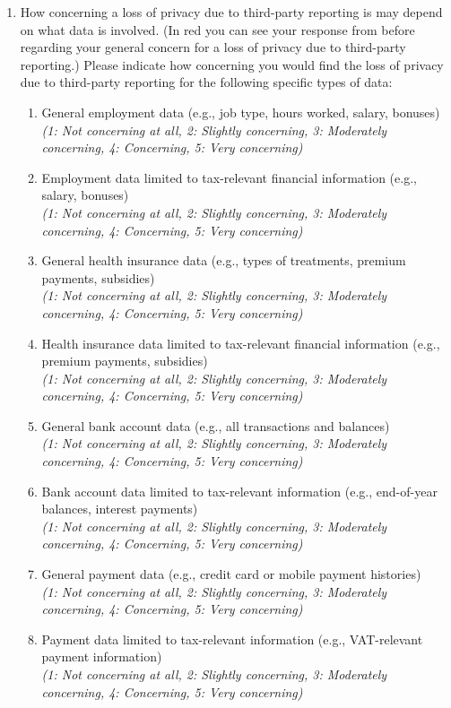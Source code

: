 \documentclass[11pt]{article}
\begin{document}
\begin{enumerate}[resume]
    \item How concerning a loss of privacy due to third-party reporting is may depend on what data is involved. (In red you can see your response from before regarding your general concern for a loss of privacy due to third-party reporting.) Please indicate how concerning you would find the loss of privacy due to third-party reporting for the following specific types of data:

\begin{enumerate}[label=\alph*)]
        \item General employment data (e.g., job type, hours worked, salary, bonuses)\\
        \textit{(1: Not concerning at all, 2: Slightly concerning, 3: Moderately concerning, 4: Concerning, 5: Very concerning)}
        \item Employment data limited to tax-relevant financial information (e.g., salary, bonuses)\\
        \textit{(1: Not concerning at all, 2: Slightly concerning, 3: Moderately concerning, 4: Concerning, 5: Very concerning)}
        \item General health insurance data (e.g., types of treatments, premium payments, subsidies)\\
        \textit{(1: Not concerning at all, 2: Slightly concerning, 3: Moderately concerning, 4: Concerning, 5: Very concerning)}
        \item Health insurance data limited to tax-relevant financial information (e.g., premium payments, subsidies)\\
        \textit{(1: Not concerning at all, 2: Slightly concerning, 3: Moderately concerning, 4: Concerning, 5: Very concerning)}
        \item General bank account data (e.g., all transactions and balances)\\
        \textit{(1: Not concerning at all, 2: Slightly concerning, 3: Moderately concerning, 4: Concerning, 5: Very concerning)}
        \item Bank account data limited to tax-relevant information (e.g., end-of-year balances, interest payments)\\
       \textit{(1: Not concerning at all, 2: Slightly concerning, 3: Moderately concerning, 4: Concerning, 5: Very concerning)}
        \item General payment data (e.g., credit card or mobile payment histories)\\
        \textit{(1: Not concerning at all, 2: Slightly concerning, 3: Moderately concerning, 4: Concerning, 5: Very concerning)}
        \item Payment data limited to tax-relevant information (e.g., VAT-relevant payment information)\\
        \textit{(1: Not concerning at all, 2: Slightly concerning, 3: Moderately concerning, 4: Concerning, 5: Very concerning)}
\end{enumerate}
\end{enumerate}
\end{document}
